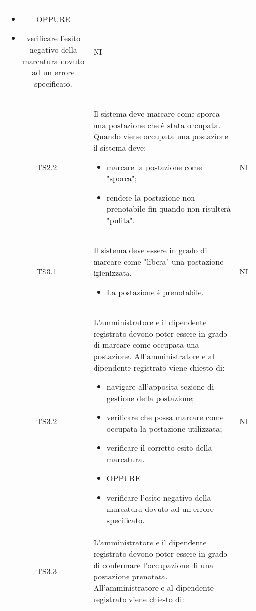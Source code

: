 {\begin{longtable}{ c C{11cm} c }
\begin{itemize}
            \item [] OPPURE
            \item verificare l'esito negativo della marcatura dovuto ad un errore specificato.
        \end{itemize}&
        NI\\
        TS2.2&
        Il sistema deve marcare come sporca una postazione che \`{e} stata occupata.\newline
        Quando viene occupata una postazione il sistema deve:
        \begin{itemize}
            \item marcare la postazione come "sporca";
            \item rendere la postazione non prenotabile fin quando non risulter\`{a} "pulita".
        \end{itemize}&
        NI\\
        TS3.1&
        Il sistema deve essere in grado di marcare come "libera" una postazione igienizzata.\newline
        \begin{itemize}
            \item La postazione \`{e} prenotabile.
        \end{itemize}&
        NI\\
        TS3.2&
        L'amministratore e il dipendente registrato devono poter essere in grado di marcare come occupata una postazione.\newline
        All'amministratore e al dipendente registrato viene chiesto di:
        \begin{itemize}
            \item navigare all'apposita sezione di gestione della postazione;
            \item verificare che possa marcare come occupata la postazione utilizzata;
            \item verificare il corretto esito della marcatura.
            \item [] OPPURE
            \item verificare l'esito negativo della marcatura dovuto ad un errore specificato.
        \end{itemize}&
        NI\\
        TS3.3&
        L'amministratore e il dipendente registrato devono poter essere in grado di confermare l'occupazione di una postazione prenotata.\newline
        All'amministratore e al dipendente registrato viene chiesto di:

\end{longtable}}
